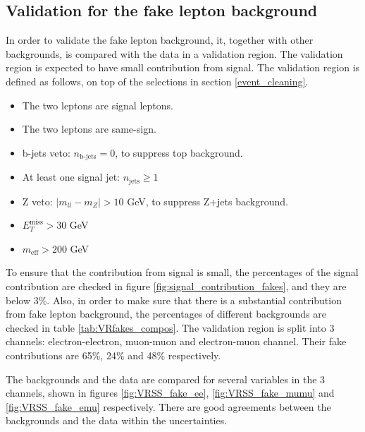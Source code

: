 \subsection{Validation for the fake lepton background}
In order to validate the fake lepton background, it, together with other backgrounds, is compared with the data in a validation region.
The validation region is expected to have small contribution from signal.
The validation region is defined as follows, on top of the selections in section \ref{event_cleaning}.
\begin{itemize}
\item The two leptons are signal leptons.
\item The two leptons are same-sign.
\item b-jets veto: $n_{\text{b-jets}} = 0$, to suppress top background.
\item At least one signal jet: $n_{\text{jets}} \geq 1$
\item Z veto: $|m_{ll} - m_Z| > 10$ GeV, to suppress Z+jets background.
\item $E_{T}^{\text{miss}} > 30$ GeV
\item $m_{\text{eff}} > 200$ GeV
\end{itemize}

To ensure that the contribution from signal is small, the percentages of the signal contribution are checked in figure \ref{fig:signal_contribution_fakes}, and they are below 3\%.
Also, in order to make sure that there is a substantial contribution from fake lepton background, the percentages of different backgrounds are checked in table \ref{tab:VRfakes_compos}.
The validation region is split into 3 channels: electron-electron, muon-muon and electron-muon channel.
Their fake contributions are 65\%,  24\% and 48\% respectively.

The backgrounds and the data are compared for several variables in the 3 channels, shown in figures \ref{fig:VRSS_fake_ee}, \ref{fig:VRSS_fake_mumu} and \ref{fig:VRSS_fake_emu} respectively.
There are good agreements between the backgrounds and the data within the uncertainties.

